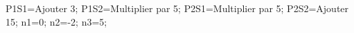 \documentclass[exercice]{thedocument}%
\begin{document}
%
    \>P1S1=Ajouter 3;%
    \>P1S2=Multiplier par 5;%
    \>P2S1=Multiplier par 5;%
    \>P2S2=Ajouter 15;%
    \>n1=0;%
    \>n2=-2;%
    \>n3=5;%
\end{document}
